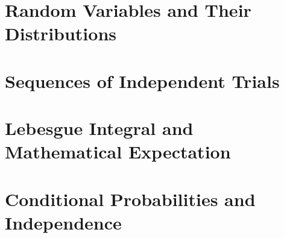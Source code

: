 \documentclass{report}
\begin{document}

\chapter{Random Variables and Their Distributions}

\chapter{Sequences of Independent Trials}

\chapter{Lebesgue Integral and Mathematical Expectation}

\chapter{Conditional Probabilities and Independence}

\end{document}
